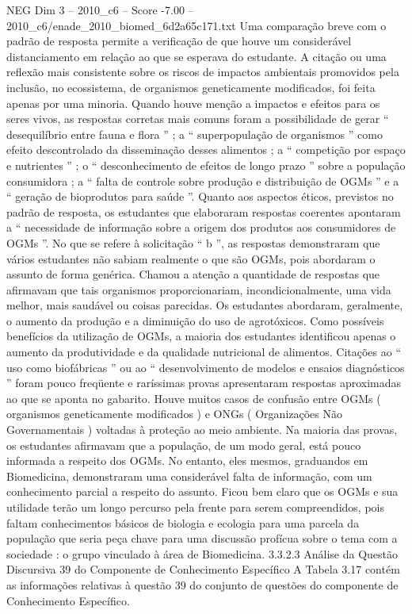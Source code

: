 \begin{textsample}{NEG Dim 3 – 2010\_c6 – Score -7.00 – 2010\_c6/enade\_2010\_biomed\_6d2a65c171.txt}
Uma comparação breve com o padrão de resposta permite a verificação de que houve um considerável distanciamento em relação ao que se esperava do estudante.
A citação ou uma reflexão mais consistente sobre os riscos de impactos ambientais promovidos pela inclusão, no ecossistema, de organismos geneticamente modificados, foi feita apenas por uma minoria.
Quando houve menção a impactos e efeitos para os seres vivos, as respostas corretas mais comuns foram a possibilidade de gerar “ desequilíbrio entre fauna e flora ” ; a “ superpopulação de organismos ” como efeito descontrolado da disseminação desses alimentos ; a “ competição por espaço e nutrientes ” ; o “ desconhecimento de efeitos de longo prazo ” sobre a população consumidora ; a “ falta de controle sobre produção e distribuição de OGMs ” e a “ geração de bioprodutos para saúde ”.
Quanto aos aspectos éticos, previstos no padrão de resposta, os estudantes que elaboraram respostas coerentes apontaram a “ necessidade de informação sobre a origem dos produtos aos consumidores de OGMs ”.
No que se refere à solicitação “ b ”, as respostas demonstraram que vários estudantes não sabiam realmente o que são OGMs, pois abordaram o assunto de forma genérica.
Chamou a atenção a quantidade de respostas que afirmavam que tais organismos proporcionariam, incondicionalmente, uma vida melhor, mais saudável ou coisas parecidas.
Os estudantes abordaram, geralmente, o aumento da produção e a diminuição do uso de agrotóxicos.
Como possíveis benefícios da utilização de OGMs, a maioria dos estudantes identificou apenas o aumento da produtividade e da qualidade nutricional de alimentos.
Citações ao “ uso como biofábricas ” ou ao “ desenvolvimento de modelos e ensaios diagnósticos ” foram pouco freqüente e raríssimas provas apresentaram respostas aproximadas ao que se aponta no gabarito.
Houve muitos casos de confusão entre OGMs ( organismos geneticamente modificados ) e ONGs ( Organizações Não Governamentais ) voltadas à proteção ao meio ambiente.
Na maioria das provas, os estudantes afirmavam que a população, de um modo geral, está pouco informada a respeito dos OGMs.
No entanto, eles mesmos, graduandos em Biomedicina, demonstraram uma considerável falta de informação, com um conhecimento parcial a respeito do assunto.
Ficou bem claro que os OGMs e sua utilidade terão um longo percurso pela frente para serem compreendidos, pois faltam conhecimentos básicos de biologia e ecologia para uma parcela da população que seria peça chave para uma discussão profícua sobre o tema com a sociedade : o grupo vinculado à área de Biomedicina. 3.3.2.3 Análise da Questão Discursiva 39 do Componente de Conhecimento Específico A Tabela 3.17 contém as informações relativas à questão 39 do conjunto de questões do componente de Conhecimento Específico.

\end{textsample}
